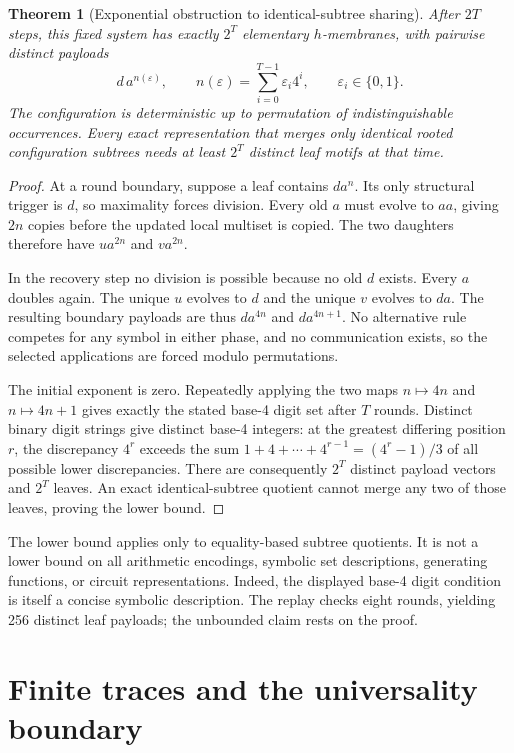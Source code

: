 \documentclass[11pt,letterpaper]{article}
\newtheorem{theorem}{Theorem}[section]
\theoremstyle{definition}
\theoremstyle{remark}
\begin{document}
\begin{theorem}[Exponential obstruction to identical-subtree sharing]\label{qoc:mm:thm:antishare}
After $2T$ steps, this fixed system has exactly $2^T$ elementary $h$-membranes, with pairwise distinct payloads
\[
 d\,a^{n(\varepsilon)},\qquad
 n(\varepsilon)=\sum_{i=0}^{T-1}\varepsilon_i4^i,
 \qquad\varepsilon_i\in\{0,1\}.
\]
The configuration is deterministic up to permutation of indistinguishable occurrences. Every exact representation that merges only identical rooted configuration subtrees needs at least $2^T$ distinct leaf motifs at that time.
\end{theorem}
\begin{proof}
At a round boundary, suppose a leaf contains $da^n$. Its only structural trigger is $d$, so maximality forces division. Every old $a$ must evolve to $aa$, giving $2n$ copies before the updated local multiset is copied. The two daughters therefore have $ua^{2n}$ and $va^{2n}$.

In the recovery step no division is possible because no old $d$ exists. Every $a$ doubles again. The unique $u$ evolves to $d$ and the unique $v$ evolves to $da$. The resulting boundary payloads are thus $da^{4n}$ and $da^{4n+1}$. No alternative rule competes for any symbol in either phase, and no communication exists, so the selected applications are forced modulo permutations.

The initial exponent is zero. Repeatedly applying the two maps $n\mapsto4n$ and $n\mapsto4n+1$ gives exactly the stated base-4 digit set after $T$ rounds. Distinct binary digit strings give distinct base-4 integers: at the greatest differing position $r$, the discrepancy $4^r$ exceeds the sum $1+4+\cdots+4^{r-1}=(4^r-1)/3$ of all possible lower discrepancies. There are consequently $2^T$ distinct payload vectors and $2^T$ leaves. An exact identical-subtree quotient cannot merge any two of those leaves, proving the lower bound.
\end{proof}
The lower bound applies only to equality-based subtree quotients. It is not a lower bound on all arithmetic encodings, symbolic set descriptions, generating functions, or circuit representations. Indeed, the displayed base-4 digit condition is itself a concise symbolic description. The replay checks eight rounds, yielding 256 distinct leaf payloads; the unbounded claim rests on the proof.

\section{Finite traces and the universality boundary}\label{qoc:mm:sec:universality}
\end{document}
